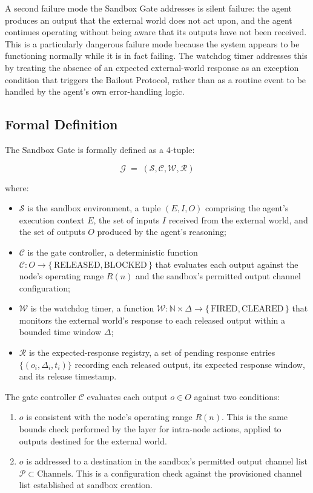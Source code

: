 A second failure mode the Sandbox Gate addresses is silent failure: the agent produces an output that the external world does not act upon, and the agent continues operating without being aware that its outputs have not been received. This is a particularly dangerous failure mode because the system appears to be functioning normally while it is in fact failing. The watchdog timer addresses this by treating the absence of an expected external-world response as an exception condition that triggers the Bailout Protocol, rather than as a routine event to be handled by the agent's own error-handling logic.

\subsection{Formal Definition}\label{sec:sandbox-gate-formal}

The Sandbox Gate is formally defined as a 4-tuple:

\[
\mathcal{G} \;=\; (\mathcal{S}, \mathcal{C}, \mathcal{W}, \mathcal{R})
\]

where:

\begin{itemize}\itemsep=0pt
\item $\mathcal{S}$ is the sandbox environment, a tuple $(E, I, O)$ comprising the agent's execution context $E$, the set of inputs $I$ received from the external world, and the set of outputs $O$ produced by the agent's reasoning;
\item $\mathcal{C}$ is the gate controller, a deterministic function $\mathcal{C} : O \to \{\,\text{RELEASED}, \text{BLOCKED}\,\}$ that evaluates each output against the node's operating range $R(n)$ and the sandbox's permitted output channel configuration;
\item $\mathcal{W}$ is the watchdog timer, a function $\mathcal{W} : \mathbb{N} \times \Delta \to \{\,\text{FIRED}, \text{CLEARED}\,\}$ that monitors the external world's response to each released output within a bounded time window $\Delta$;
\item $\mathcal{R}$ is the expected-response registry, a set of pending response entries $\{(o_i, \Delta_i, t_i)\}$ recording each released output, its expected response window, and its release timestamp.
\end{itemize}

The gate controller $\mathcal{C}$ evaluates each output $o \in O$ against two conditions:

\begin{enumerate}\itemsep=0pt
\item[\textbf{Bounds check.}] $o$ is consistent with the node's operating range $R(n)$. This is the same bounds check performed by the \bounds{} layer for intra-node actions, applied to outputs destined for the external world.

\item[\textbf{Channel check.}] $o$ is addressed to a destination in the sandbox's permitted output channel list $\mathcal{P} \subset \text{Channels}$. This is a configuration check against the provisioned channel list established at sandbox creation.
\end{enumerate}

